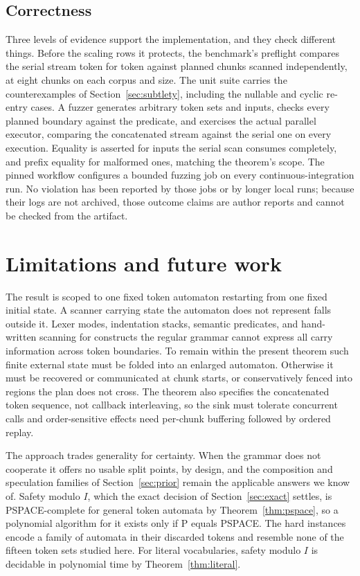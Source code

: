 \documentclass[11pt,a4paper]{article}
\theoremstyle{definition}
\theoremstyle{plain}
\begin{document}
\subsection{Correctness}

Three levels of evidence support the implementation, and they check different things. Before the scaling rows it
protects, the benchmark's preflight compares the serial stream token for token against planned chunks scanned
independently, at eight chunks on each corpus and size. The unit suite carries the counterexamples of
Section~\ref{sec:subtlety}, including the nullable and cyclic re-entry cases. A fuzzer generates arbitrary token sets
and inputs, checks every planned boundary against the predicate, and exercises the actual parallel executor, comparing
the concatenated stream against the serial one on every execution. Equality is asserted for inputs the serial scan
consumes completely, and prefix equality for malformed ones, matching the theorem's scope. The pinned workflow
configures a bounded fuzzing job on every continuous-integration run. No violation has been reported by those jobs or by
longer local runs; because their logs are not archived, those outcome claims are author reports and cannot be checked
from the artifact.

\section{Limitations and future work}

The result is scoped to one fixed token automaton restarting from one fixed initial state. A scanner carrying state the
automaton does not represent falls outside it. Lexer modes, indentation stacks, semantic predicates, and hand-written
scanning for constructs the regular grammar cannot express all carry information across token boundaries. To remain
within the present theorem such finite external state must be folded into an enlarged automaton. Otherwise it must be
recovered or communicated at chunk starts, or conservatively fenced into regions the plan does not cross. The theorem
also specifies the concatenated token sequence, not callback interleaving, so the sink must tolerate concurrent calls
and order-sensitive effects need per-chunk buffering followed by ordered replay.

The approach trades generality for certainty. When the grammar does not cooperate it offers no usable split points, by
design, and the composition and speculation families of Section~\ref{sec:prior} remain the applicable answers we know
of. Safety modulo $I$, which the exact decision of Section~\ref{sec:exact} settles, is PSPACE-complete for general token
automata by Theorem~\ref{thm:pspace}, so a polynomial algorithm for it exists only if P equals PSPACE. The hard
instances encode a family of automata in their discarded tokens and resemble none of the fifteen token sets studied
here. For literal vocabularies, safety modulo $I$ is decidable in polynomial time by Theorem~\ref{thm:literal}.
\end{document}
